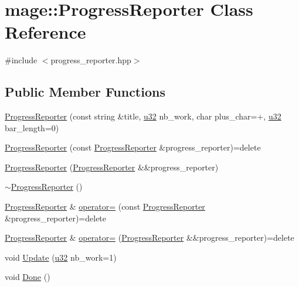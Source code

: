 \hypertarget{classmage_1_1_progress_reporter}{}\section{mage\+:\+:Progress\+Reporter Class Reference}
\label{classmage_1_1_progress_reporter}


{\ttfamily \#include $<$progress\+\_\+reporter.\+hpp$>$}

\subsection*{Public Member Functions}
\begin{DoxyCompactItemize}
\item 
\hyperlink{classmage_1_1_progress_reporter_af654511c79e28e28f0a83e17dbf1c11e}{Progress\+Reporter} (const string \&title, \hyperlink{namespacemage_af2b398bf98eb10351f49cad73fe2cc73}{u32} nb\+\_\+work, char plus\+\_\+char=\textquotesingle{}+\textquotesingle{}, \hyperlink{namespacemage_af2b398bf98eb10351f49cad73fe2cc73}{u32} bar\+\_\+length=0)
\item 
\hyperlink{classmage_1_1_progress_reporter_a59c1ca6e4c0d480a1726d79ef6d42e74}{Progress\+Reporter} (const \hyperlink{classmage_1_1_progress_reporter}{Progress\+Reporter} \&progress\+\_\+reporter)=delete
\item 
\hyperlink{classmage_1_1_progress_reporter_a5e7036f1a90e019fc75b6afca4459a78}{Progress\+Reporter} (\hyperlink{classmage_1_1_progress_reporter}{Progress\+Reporter} \&\&progress\+\_\+reporter)
\item 
\hyperlink{classmage_1_1_progress_reporter_aa543239c6dd4474a77cf4cf6904c1b26}{$\sim$\+Progress\+Reporter} ()
\item 
\hyperlink{classmage_1_1_progress_reporter}{Progress\+Reporter} \& \hyperlink{classmage_1_1_progress_reporter_a7bc52147f6d2e30d897f512f910c8917}{operator=} (const \hyperlink{classmage_1_1_progress_reporter}{Progress\+Reporter} \&progress\+\_\+reporter)=delete
\item 
\hyperlink{classmage_1_1_progress_reporter}{Progress\+Reporter} \& \hyperlink{classmage_1_1_progress_reporter_aba75cd5ea2d9faae4264b844f857e260}{operator=} (\hyperlink{classmage_1_1_progress_reporter}{Progress\+Reporter} \&\&progress\+\_\+reporter)=delete
\item 
void \hyperlink{classmage_1_1_progress_reporter_a0975a0706d03f0f8d8119d64bc480ba0}{Update} (\hyperlink{namespacemage_af2b398bf98eb10351f49cad73fe2cc73}{u32} nb\+\_\+work=1)
\item 
void \hyperlink{classmage_1_1_progress_reporter_a11d758647ac2082bc296ab53a7454eaa}{Done} ()
\end{DoxyCompactItemize}
